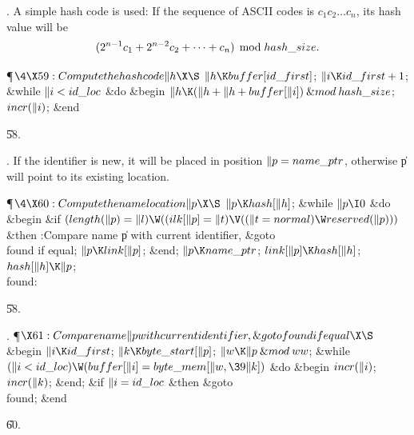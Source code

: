 . A simple hash code is used: If the sequence of
ASCII codes is $c_1c_2\ldots c_n$, its hash value will be
$$(2^{n-1}c_1+2^{n-2}c_2+\cdots+c_n)\,\bmod\,\\{hash\_size}.$$

\Y\P$\4\X59:Compute the hash code \|h\X\S$\6
$\|h\K\\{buffer}[\\{id\_first}]$;\5
$\|i\K\\{id\_first}+1$;\6
\&{while} $\|i<\\{id\_loc}$ \1\&{do}\6
\&{begin} $\|h\K(\|h+\|h+\\{buffer}[\|i])\mathbin{\&{mod}}\\{hash\_size}$;\5
$\\{incr}(\|i)$;\6
\&{end}\2\par
\U58.\fi

. If the identifier is new, it will be placed in position $\|p=\\{name%
\_ptr}$,
otherwise \|p will point to its existing location.

\Y\P$\4\X60:Compute the name location \|p\X\S$\6
$\|p\K\\{hash}[\|h]$;\6
\&{while} $\|p\I0$ \1\&{do}\6
\&{begin} \&{if} $(\\{length}(\|p)=\|l)\W((\\{ilk}[\|p]=\|t)\V((\|t=%
\\{normal})\W\\{reserved}(\|p)))$ \1\&{then}\5
:Compare name \|p with current identifier, \&{goto} \\{found} if equal\X;\2%
\6
$\|p\K\\{link}[\|p]$;\6
\&{end};\2\6
$\|p\K\\{name\_ptr}$;\6
$\\{link}[\|p]\K\\{hash}[\|h]$;\5
$\\{hash}[\|h]\K\|p$;\6
\4\\{found}: \par
\U58.\fi

. \P$\X61:Compare name \|p with current identifier, \&{goto} \\{found} if
equal\X\S$\6
\&{begin} $\|i\K\\{id\_first}$;\5
$\|k\K\\{byte\_start}[\|p]$;\5
$\|w\K\|p\mathbin{\&{mod}}\\{ww}$;\6
\&{while} $(\|i<\\{id\_loc})\W(\\{buffer}[\|i]=\\{byte\_mem}[\|w,\39\|k])$ \1%
\&{do}\6
\&{begin} $\\{incr}(\|i)$;\5
$\\{incr}(\|k)$;\6
\&{end};\2\6
\&{if} $\|i=\\{id\_loc}$ \1\&{then}\5
\&{goto} \\{found};\2\6
\&{end}\par
\U60.\fi

